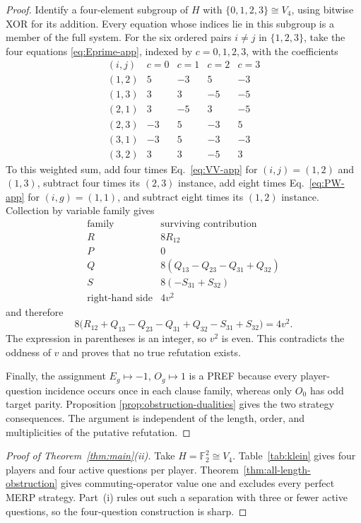 \documentclass[11pt]{article}
\theoremstyle{definition}
\theoremstyle{remark}
\newcommand{\F}{\mathbb{F}}
\numberwithin{equation}{section}
\begin{document}
\begin{proof}
Identify a four-element subgroup of \(H\) with
\(\{0,1,2,3\}\cong V_4\), using bitwise XOR for its addition.  Every equation
whose indices lie in this subgroup is a member of the full system.
For the six ordered pairs \(i\ne j\) in \(\{1,2,3\}\), take the four
equations \eqref{eq:Eprime-app}, indexed by \(c=0,1,2,3\), with the
coefficients
\[
\begin{array}{c|rrrr}
(i,j)&c=0&c=1&c=2&c=3\\ \hline
(1,2)& 5&-3& 5&-3\\
(1,3)& 3& 3&-5&-5\\
(2,1)& 3&-5& 3&-5\\
(2,3)&-3& 5&-3& 5\\
(3,1)&-3& 5&-3&-3\\
(3,2)& 3& 3&-5& 3
\end{array}
\]
To this weighted sum, add four times Eq.~\eqref{eq:VV-app} for
\((i,j)=(1,2)\) and \((1,3)\), subtract four times its \((2,3)\) instance,
add eight times Eq.~\eqref{eq:PW-app} for \((i,g)=(1,1)\), and subtract eight
times its \((1,2)\) instance.  Collection by variable family gives
\[
\begin{array}{c|l}
\text{family}&\text{surviving contribution}\\
\hline
R&8R_{12}\\
P&0\\
Q&8(Q_{13}-Q_{23}-Q_{31}+Q_{32})\\
S&8(-S_{31}+S_{32})\\
\text{right-hand side}&4v^2
\end{array}
\]
and therefore
\[
  8\bigl(
  R_{12}+Q_{13}-Q_{23}-Q_{31}+Q_{32}-S_{31}+S_{32}
  \bigr)=4v^2.
\]
The expression in parentheses is an integer, so \(v^2\) is even.  This
contradicts the oddness of \(v\) and proves that no true refutation exists.

Finally, the assignment \(E_g\mapsto-1\), \(O_g\mapsto1\) is a PREF because
every player-question incidence occurs once in each clause family, whereas
only \(O_0\) has odd target parity.  Proposition
\ref{prop:obstruction-dualities} gives the two strategy consequences.  The
argument is independent of the length, order, and multiplicities of the
putative refutation.
\end{proof}

\begin{proof}[Proof of Theorem~\ref{thm:main}(ii)]
Take \(H=\F_2^2\cong V_4\).  Table~\ref{tab:klein} gives four players and
four active questions per player.  Theorem~\ref{thm:all-length-obstruction}
gives commuting-operator value one and excludes every perfect MERP strategy.
Part~(i) rules out such a separation with three or fewer active questions,
so the four-question construction is sharp.
\end{proof}
\end{document}
